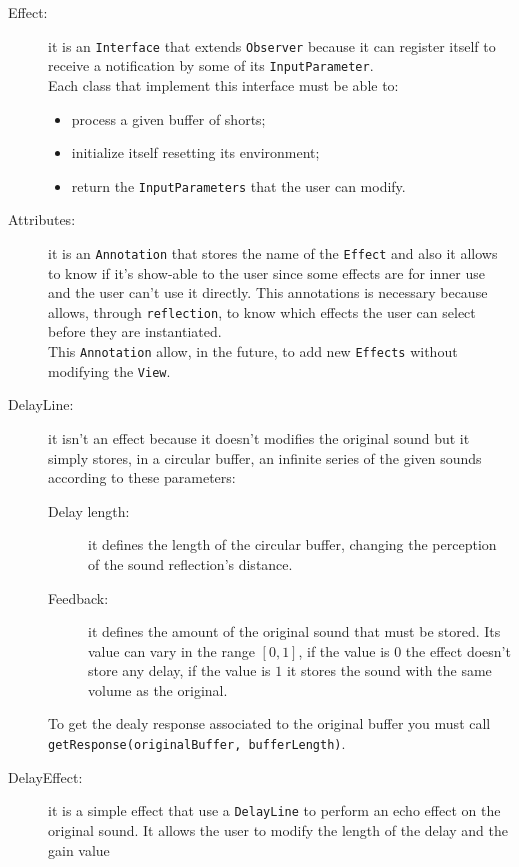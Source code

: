 \begin{description}
  \item[Effect:] it is an \texttt{Interface} that extends
    \texttt{Observer} because it can register itself to receive a
    notification by some of its \texttt{InputParameter}.\\
    Each class that implement this interface must be able to:
    \begin{itemize}
      \item process a given buffer of shorts;
      \item initialize itself resetting its environment;
      \item return the \texttt{InputParameters} that the user can modify.
    \end{itemize}
  \item[Attributes:] it is an \texttt{Annotation} that stores
    the name of the \texttt{Effect} and also it allows to know if it's
    show-able to the user since some effects are for inner use and the
    user can't use it directly.
    This annotations is necessary because allows,
    through \texttt{reflection}, to know which effects the user can
    select before they are instantiated.\\
    This \texttt{Annotation} allow, in the future, to add new
    \texttt{Effects} without modifying the \texttt{View}.
  \item[DelayLine:] it isn't an effect because it doesn't modifies
    the original sound but it simply stores, in a circular buffer, an
    infinite series of the given sounds according to these parameters:
    \begin{description}
      \item[Delay length:] it defines the length of the circular
        buffer, changing the perception of the sound reflection's
        distance.
      \item[Feedback:] it defines the amount of the original
        sound that must be stored. Its value can vary in the range $[0,1]$, 
        if the value is $0$ the effect doesn't store any delay, if the value
        is $1$ it stores the sound with the same volume as the original.
    \end{description}
    To get the dealy response associated to the original buffer
    you must call \texttt{getResponse(originalBuffer, bufferLength)}.
  \item[DelayEffect:] it is a simple effect that use a
    \texttt{DelayLine} to perform an echo effect on the original sound.
    It allows the user to modify the length of the delay and the gain value

\end{description}

